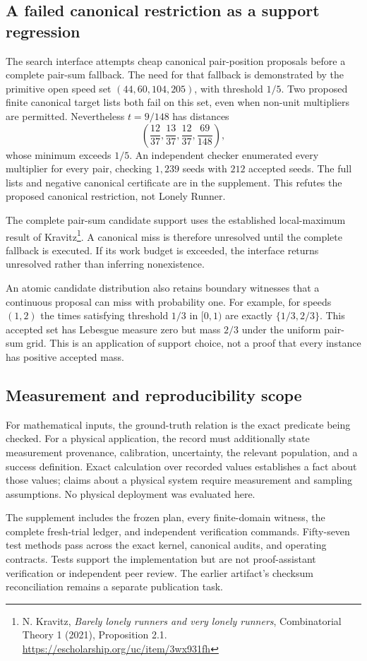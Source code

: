 \subsection{A failed canonical restriction as a support regression}

The search interface attempts cheap canonical pair-position proposals before
a complete pair-sum fallback. The need for that fallback is demonstrated by
the primitive open speed set $(44,60,104,205)$, with threshold $1/5$.
Two proposed finite canonical target lists both fail on this set, even when
non-unit multipliers are permitted. Nevertheless $t=9/148$ has distances
\[
  \left(\frac{12}{37},\frac{13}{37},\frac{12}{37},\frac{69}{148}\right),
\]
whose minimum exceeds $1/5$. An independent checker enumerated every
multiplier for every pair, checking $1{,}239$ seeds with $212$ accepted seeds.
The full lists and negative canonical certificate are in the supplement.
This refutes the proposed canonical restriction, not Lonely Runner.

The complete pair-sum candidate support uses the established local-maximum
result of Kravitz\footnote{N. Kravitz, \emph{Barely lonely runners and very
lonely runners}, Combinatorial Theory 1 (2021), Proposition 2.1.
\url{https://escholarship.org/uc/item/3wx931fh}}. A canonical miss is therefore
unresolved until the complete fallback is executed. If its work budget is
exceeded, the interface returns unresolved rather than inferring nonexistence.

An atomic candidate distribution also retains boundary witnesses that a
continuous proposal can miss with probability one. For example, for speeds
$(1,2)$ the times satisfying threshold $1/3$ in $[0,1)$ are exactly
$\{1/3,2/3\}$. This accepted set has Lebesgue measure zero but mass $2/3$
under the uniform pair-sum grid. This is an application of support choice,
not a proof that every instance has positive accepted mass.

\subsection{Measurement and reproducibility scope}

For mathematical inputs, the ground-truth relation is the exact predicate
being checked. For a physical application, the record must additionally state
measurement provenance, calibration, uncertainty, the relevant population,
and a success definition. Exact calculation over recorded values establishes
a fact about those values; claims about a physical system require measurement
and sampling assumptions. No physical deployment was evaluated here.

The supplement includes the frozen plan, every finite-domain witness, the
complete fresh-trial ledger, and independent verification commands. Fifty-seven
test methods pass across the exact kernel, canonical audits, and operating
contracts. Tests support the implementation but are not proof-assistant
verification or independent peer review. The earlier artifact's checksum
reconciliation remains a separate publication task.
